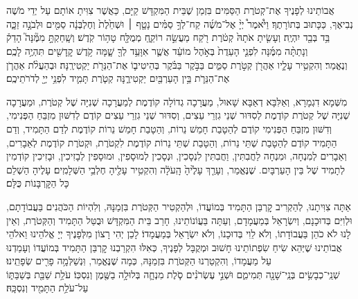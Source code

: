 \documentclass[twoside, openany, parskip=half, 11pt]{book}
\begin{document}
\newcommand{\ketoret}{
\firstword{אַתָּה הוּא יְיָ אֱלֹהֵינוּ שֶׁהִקְטִירוּ}
אֲבוֹתֵינוּ לְפָנֶיךָ אֶת־קְטֹרֶת הַסַּמִּים בִּזְמַן שֶׁבֵּית הַמִּקְדָּשׁ קַיָּם, כַּאֲשֶׁר צִוִּיתָ אוֹתָם עַל יְדֵי מֹשֶׁה נְבִיאֶךָ, כַּכָּתוּב בְּתוֹרָתֶךָ׃
וַיֹּ֩אמֶר֩ יְיָ֨ אֶל־מֹשֶׁ֜ה קַח־לְךָ֣ סַמִּ֗ים\source{שמות ל} נָטָ֤ף ׀ וּשְׁחֵ֙לֶת֙ וְחֶלְבְּנָ֔ה סַמִּ֖ים וּלְבֹנָ֣ה זַכָּ֑ה בַּ֥ד בְּבַ֖ד יִהְיֶֽה׃ וְעָשִׂ֤יתָ אֹתָהּ֙ קְטֹ֔רֶת רֹ֖קַח מַעֲשֵׂ֣ה רוֹקֵ֑חַ מְמֻלָּ֖ח טָה֥וֹר קֹֽדֶשׁ׃ וְשָֽׁחַקְתָּ֣ מִמֶּ֘נָּה֮ הָדֵק֒ וְנָתַתָּ֨ה מִמֶּ֜נָּה לִפְנֵ֤י הָעֵדֻת֙ בְּאֹ֣הֶל מוֹעֵ֔ד אֲשֶׁ֛ר אִוָּעֵ֥ד לְךָ֖ שָׁ֑מָּה קֹ֥דֶשׁ קׇֽדָשִׁ֖ים תִּהְיֶ֥ה לָכֶֽם׃\\
וְנֶאֱמַר׃ וְהִקְטִ֥יר עָלָ֛יו אַהֲרֹ֖ן קְטֹ֣רֶת סַמִּ֑ים בַּבֹּ֣קֶר בַּבֹּ֗קֶר בְּהֵיטִיב֛וֹ אֶת־הַנֵּרֹ֖ת יַקְטִירֶֽנָּה׃ וּבְהַעֲלֹ֨ת אַהֲרֹ֧ן אֶת־הַנֵּרֹ֛ת בֵּ֥ין הָעַרְבַּ֖יִם יַקְטִירֶ֑נָּה קְטֹ֧רֶת תָּמִ֛יד לִפְנֵ֥י יְיָ֖ לְדֹרֹתֵיכֶֽם׃


}
\\
\tamid
\\
\ketoret
{}  מִשְּׁמָא דִגְמָרָא, וְאַלִּבָּא דְאַבָּא שָׁאוּל, מַעֲרָכָה גְדוֹלָה קוֹדֶמֶת לְמַעֲרָכָה שְׁנִיָּה שֶׁל קְטֹרֶת, וּמַעֲרָכָה שְׁנִיָּה שֶׁל קְטֹרֶת קוֹדֶמֶת לְסִדּוּר שְׁנֵי גִזְרֵי עֵצִים, וְסִדּוּר שְׁנֵי גִזְרֵי עֵצִים קוֹדֶם לְדִשּׁוּן מִזְבֵּחַ הַפְּנִימִי, וְדִשּׁוּן מִזְבֵּחַ הַפְּנִימִי קוֹדֶם לְהַטָבַת חָמֵשׁ נֵרוֹת, וְהַטָבַת חָמֵשׁ נֵרוֹת קוֹדֶמֶת לְדַם הַתָּמִיד, וְדַם הַתָּמִיד קוֹדֶם לְהַטָבַת שְׁתֵּי נֵרוֹת, וְהַטָבַת שְׁתֵּי נֵרוֹת קוֹדֶמֶת לִקְטֹרֶת, וּקְטֹרֶת קוֹדֶמֶת לְאֵבָרִים, וְאֵבָרִים לְמִנְחָה, וּמִנְחָה לַחֲבִתִּין, וַחֲבִתִּין לִנְסָכִין, וּנְסָכִין לְמוּסָפִין, וּמוּסָפִין לְבָזִיכִין, וּבָזִיכִין קוֹדְמִין לְתָמִיד שֶׁל בֵּין הָעַרְבָּיִם. שֶׁנֶּאֱמַר, וְעָרַ֤ךְ  עָלֶ֙יהָ֙ הָֽעֹלָ֔ה וְהִקְטִ֥יר עָלֶ֖יהָ חֶלְבֵ֥י הַשְּׁלָמִֽים׃ עָלֶיהָ הַשְׁלֵם כָּל הַקׇּרְבָּנוֹת כֻּלָּם׃

 אַתָּה צִוִּיתָנוּ, לְהַקְרִיב קׇרְבַּן הַתָּמִיד בְּמוֹעֲדוֹ, וּלְהַקְטִיר הַקְּטֹרֶת בִּזְמַנָּהּ, וְלִהְיוֹת הַכֹּהֲנִים בַּעֲבוֹדָתָם, וּלְוִיִּם בְּדוּכָנָם, וְיִשְׂרָאֵל בְּמַעֲמָדָם, וְעַתָּה בַּעֲוֹנוֹתֵינוּ, חָרַב בֵּית הַמִּקְדָּשׁ וּבֻטַּל הַתָּמִיד וְהַקְּטֹרֶת, וְאֵין לָנוּ לֹא כֹהֵן בַּעֲבוֹדָתוֹ, וְלֹא לֵוִי בְּדוּכָנוֹ, וְלֹא יִשְׂרָאֵל בְּמַעֲמָדוֹ׃ לָכֵן יְהִי רָצוֹן מִלְּפָנֶיךָ יְיָ אֱלֹהֵינוּ וֵאלֹהֵי אֲבוֹתֵינוּ שֶׁיְּהֵא שִׂיחַ שִׂפְתוֹתֵינוּ חָשׁוּב וּמְקֻבָּל לְפָנֶיךָ, כְּאִלּוּ הִקְרַבְנוּ קׇרְבַּן הַתָּמִיד בְּמוֹעֲדוֹ וְעָמַדְנוּ עַל מַעֲמָדוֹ, וְהִקְטַרְנוּ הַקְּטֹרֶת בִּזְמַנָּהּ, כְּמָה שֶׁנֶּאֱמַר, וּֽנְשַׁלְּמָ֥ה  פָרִ֖ים שְׂפָתֵֽינוּ׃\\
\shabbos
{}
שְׁנֵֽי־כְבָשִׂ֥ים בְּנֵֽי־שָׁנָ֖ה תְּמִימִ֑ם וּשְׁנֵ֣י עֶשְׂרֹנִ֗ים סֹ֧לֶת מִנְחָ֛ה בְּלוּלָ֥ה בַשֶּׁ֖מֶן וְנִסְכּֽוֹ׃
עֹלַ֥ת שַׁבַּ֖ת בְּשַׁבַּתּ֑וֹ עַל־עֹלַ֥ת הַתָּמִ֖יד וְנִסְכָּֽהּ׃
\end{document}
